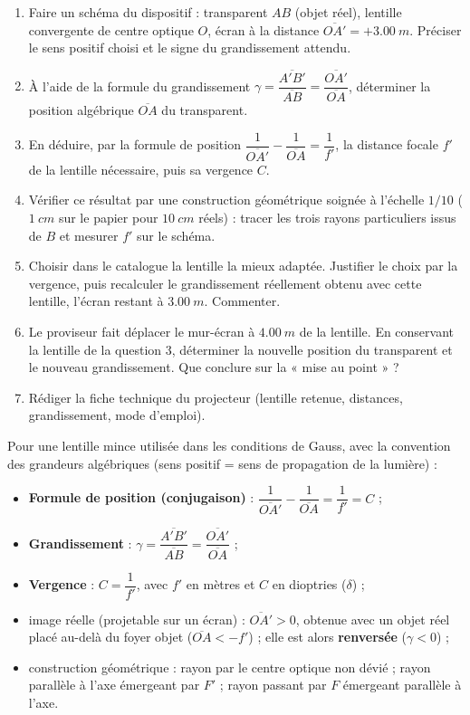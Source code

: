 \documentclass[11pt]{article}
\newcounter{popsec}
\newcounter{popsub}
\newcommand{\courssub}[1]{%
  \stepcounter{popsub}%
  \par\vspace{9pt}\noindent{\popxbold\fontsize{11.5}{13}\selectfont\color{popink}{\color{poporange}\thepopsec.\thepopsub}\hspace{6pt}#1}\par\nopagebreak\vspace{4pt}
}
\begin{document}
\begin{enumerate}
\item Faire un schéma du dispositif : transparent $AB$ (objet réel), lentille convergente de centre optique $O$, écran à la distance $\overline{OA'} = +\SI{3,00}{m}$. Préciser le sens positif choisi et le signe du grandissement attendu.
\item À l'aide de la formule du grandissement $\gamma = \dfrac{\overline{A'B'}}{\overline{AB}} = \dfrac{\overline{OA'}}{\overline{OA}}$, déterminer la position algébrique $\overline{OA}$ du transparent.
\item En déduire, par la formule de position $\dfrac{1}{\overline{OA'}} - \dfrac{1}{\overline{OA}} = \dfrac{1}{f'}$, la distance focale $f'$ de la lentille nécessaire, puis sa vergence $C$.
\item Vérifier ce résultat par une construction géométrique soignée à l'échelle $1/10$ ($\SI{1}{cm}$ sur le papier pour $\SI{10}{cm}$ réels) : tracer les trois rayons particuliers issus de $B$ et mesurer $f'$ sur le schéma.
\item Choisir dans le catalogue la lentille la mieux adaptée. Justifier le choix par la vergence, puis recalculer le grandissement réellement obtenu avec cette lentille, l'écran restant à $\SI{3,00}{m}$. Commenter.
\item Le proviseur fait déplacer le mur-écran à $\SI{4,00}{m}$ de la lentille. En conservant la lentille de la question 3, déterminer la nouvelle position du transparent et le nouveau grandissement. Que conclure sur la « mise au point » ?
\item Rédiger la fiche technique du projecteur (lentille retenue, distances, grandissement, mode d'emploi).
\end{enumerate}

\courssub{Ressources à mobiliser}

\begin{aretenir}
Pour une lentille mince utilisée dans les conditions de Gauss, avec la convention des grandeurs algébriques (sens positif = sens de propagation de la lumière) :
\begin{itemize}
\item \textbf{Formule de position (conjugaison)} : $\dfrac{1}{\overline{OA'}} - \dfrac{1}{\overline{OA}} = \dfrac{1}{f'} = C$ ;
\item \textbf{Grandissement} : $\gamma = \dfrac{\overline{A'B'}}{\overline{AB}} = \dfrac{\overline{OA'}}{\overline{OA}}$ ;
\item \textbf{Vergence} : $C = \dfrac{1}{f'}$, avec $f'$ en mètres et $C$ en dioptries ($\delta$) ;
\item image réelle (projetable sur un écran) : $\overline{OA'} > 0$, obtenue avec un objet réel placé au-delà du foyer objet ($\overline{OA} < -f'$) ; elle est alors \textbf{renversée} ($\gamma < 0$) ;
\item construction géométrique : rayon par le centre optique non dévié ; rayon parallèle à l'axe émergeant par $F'$ ; rayon passant par $F$ émergeant parallèle à l'axe.
\end{itemize}
\end{aretenir}
\end{document}
